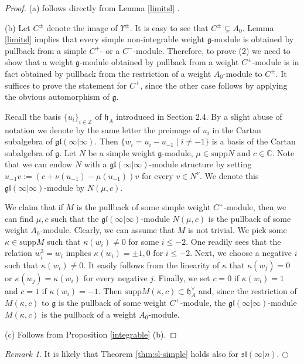 \documentclass[12pt]{amsart}
\makeatletter
\def\@putname#1#2#3#4{\def\@@ref{#3}\let\old@bf\bf
        \def\bf##1{\old@bf\if?\noexpand##1?{#4}\else##1\fi}%
	#1{#2}%
        \let\bf\old@bf}
\def\@putname#1#2#3#4{\def\@@ref{#3}\let\old@bf\bf	%
	\let\old@reset@font\reset@font			%
        \def\bf##1{\old@bf\if?\noexpand##1?{#4}\else##1\fi}%
	\def\reset@font##1##2{\old@reset@font##1\if?\noexpand##2?{#4}\else##2\fi}#1{#2}%
        \let\bf\old@bf\let\reset@font\old@reset@font}
\let\my@ref=\ref
\def\ref#1{\@putname\my@ref{#1}{#1}{\tiny\rm\@@ref}}
\theoremstyle{plain} %
\numberwithin{equation}{section}
\theoremstyle{definition}
\theoremstyle{remark}
\newtheorem{remark}[definition]{Remark} %
\theoremstyle{plain} %
\renewcommand{\gg}{\mathfrak{g}}
\newcommand{\supp}{\mathrm{supp}}
\newcommand{\gh}{\mathfrak{h}}
\def\gg{\mathfrak{g}}
\def\gh{\mathfrak{h}}
\makeatother
\begin{document}
              \begin{proof} (a) follows directly from Lemma \ref{limitsl}.
              
(b)               Let $C^{\pm}$ denote the image of $\Upsilon^{\pm}$. It is easy to see that $C^{\pm} \subsetneq A_0$. Lemma \ref{limitsl} implies that every simple non-integrable weight $\gg$-module 
              is obtained by
                pullback from a simple $C^+$- or a $C^-$-module. Therefore, to prove (2) we need to show that a weight $\gg$-module obtained by pullback from a weight $C^{\pm}$-module is in fact obtained by pullback from the restriction of a weight $A_0$-module to $C^{\pm}$.
                It suffices to prove the statement for $C^+$, since the other case  follows by applying the obvious automorphism of $\gg$.
                
                Recall the basis $\{u_i\}_{i\in\mathbb Z}$ of $\gh_A$ introduced in Section 2.4. By a slight abuse of notation we denote by the same letter
                the preimage of $u_i$ in the Cartan subalgebra of $\mathfrak{gl}(\infty|\infty)$. Then $\{w_i=u_i-u_{-1}\mid i\neq -1\}$
                is a basis of the Cartan subalgebra of $\gg$. Let $N$ be a simple weight $\gg$-module, $\mu\in \supp N$ and $c\in\mathbb C$. Note that we can endow $N$ with a  $\mathfrak{gl}(\infty|\infty)$-module structure by setting      $u_{-1}v:=(c+\nu(u_{-1})-\mu(u_{-1}))v$ for every $v\in N^{\nu}$. We denote this  $\mathfrak{gl}(\infty|\infty)$-module by $N(\mu,c)$.
                
         
                We claim that if $M$ is the pullback of some simple weight  $C^+$-module, then we can find $\mu,c$ such that the
                $\mathfrak{gl}(\infty|\infty)$-module
                $N(\mu,c)$ is the pullback of some weight $A_0$-module. Clearly, we can assume that $M$ is not trivial. We pick some
                $\kappa\in \supp M$ such that $\kappa(w_i)\neq 0$ for some $i\leq -2$.
                One readily sees that the relation $w_i^3=w_i$ implies $\kappa(w_i)=\pm 1,0$ for $i\leq -2$. Next, we choose a negative $i$ such that
                $\kappa(w_i)\neq 0$. It easily follows from the linearity of $\kappa$ that $\kappa(w_j)=0$ or  $\kappa(w_j)=\kappa(w_i)$ for every negative $j$.
                Finally, we set $c=0$ if $\kappa(w_i)=1$ and $c=1$ if $\kappa(w_i)=-1$. Then $\supp M(\kappa,c)\subset \gh^\vee_{A}$ and, since the restriction
                of $M(\kappa,c)$ to $\gg$ is the pullback of some weight $C^+$-module, the $\mathfrak{gl}(\infty|\infty)$-module $M(\kappa,c)$ is the pullback
                of a weight $A_0$-module.

                (c) Follows from Proposition \ref{integrable}(b). 
                 \end{proof}
                 \begin{remark} It is  likely that Theorem \ref{thm:sl-simple} holds also for $\mathfrak{sl}(\infty|n)$.
                   \hfill${\bigcirc}$    \end{remark}
     
\end{document}
